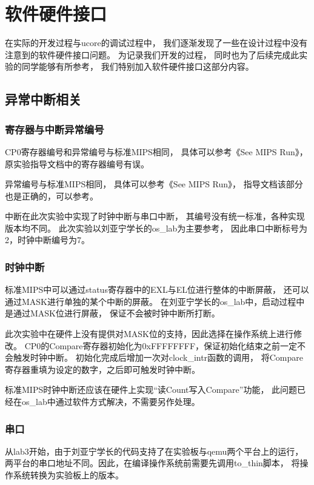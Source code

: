 \section{软件硬件接口}
    在实际的开发过程与ucore的调试过程中，%
    我们逐渐发现了一些在设计过程中没有注意到的软件硬件接口问题。%
    为记录我们开发的过程，%
    同时也为了后续完成此实验的同学能够有所参考，%
    我们特别加入软件硬件接口这部分内容。

    \subsection{异常中断相关}
        \subsubsection{寄存器与中断异常编号}
            CP0寄存器编号和异常编号与标准MIPS相同，%
            具体可以参考《See MIPS Run》，%
            原实验指导文档中的寄存器编号有误。

            异常编号与标准MIPS相同，%
            具体可以参考《See MIPS Run》，%
            指导文档该部分也是正确的，可以参考。

            中断在此次实验中实现了时钟中断与串口中断，%
            其编号没有统一标准，各种实现版本均不同。%
            此次实验以刘亚宁学长的os\_lab为主要参考，%
            因此串口中断标号为2，时钟中断编号为7。

        \subsubsection{时钟中断}
            标准MIPS中可以通过status寄存器中的EXL与EL位进行整体的中断屏蔽，%
            还可以通过MASK进行单独的某个中断的屏蔽。%
            在刘亚宁学长的os\_lab中，启动过程中是通过MASK位进行屏蔽，%
            保证不会被时钟中断所打断。

            此次实验中在硬件上没有提供对MASK位的支持，因此选择在操作系统上进行修改。%
            CP0的Compare寄存器初始化为0xFFFFFFFF，保证初始化结束之前一定不会触发时钟中断。%
            初始化完成后增加一次对clock\_intr函数的调用，%
            将Compare寄存器重填为设定的数字，之后即可触发时钟中断。

            标准MIPS时钟中断还应该在硬件上实现“读Count写入Compare”功能，%
            此问题已经在os\_lab中通过软件方式解决，不需要另作处理。

        \subsubsection{串口}
            从lab3开始，由于刘亚宁学长的代码支持了在实验板与qemu两个平台上的运行，%
            两平台的串口地址不同。因此，在编译操作系统前需要先调用to\_thin脚本，%
            将操作系统转换为实验板上的版本。

